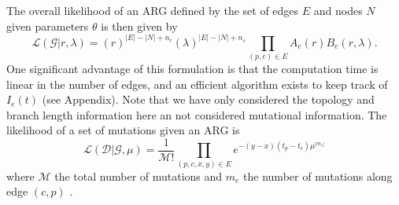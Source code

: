 \documentclass{article}
\newcommand{\comment}[1]{{\it \color{orange} (#1)}}
\begin{document}
The overall likelihood of an ARG defined by the set of edges $E$ and nodes $N$
given parameters $\theta$ is then given by
\begin{equation}\label{eq:full-lik}
    \mathcal{L}(\mathcal{G}|r, \lambda)
    =
    (r)^{|E|-|N|+n_r} (\lambda)^{|E|-|N|+n_s} \prod_{(p, c) \in E} A_e(r) B_e(r, \lambda) .
\end{equation}
One significant advantage of this formulation is that the computation time
is linear in the number of edges, and an efficient algorithm exists
to keep track of $I_e(t)$ (see Appendix).
Note that we have only considered the topology and branch length information here
an not considered mutational information.
The likelihood of a set of mutations given an ARG is
\begin{equation}\label{eq:lik-mut}
    \mathcal{L}(\mathcal{D}|\mathcal{G}, \mu)
    =
    \frac{1}{\mathcal{M}!} \prod_{(p, c, x, y) \in E} e^{-(y-x)(t_p-t_c)\mu^{|m_e|}}
\end{equation}
where $\mathcal{M}$ the total number of mutations and $m_e$
the number of mutations along edge $(c,p)$ \citep{mahmoudi_bayesian_2022}.
\end{document}
